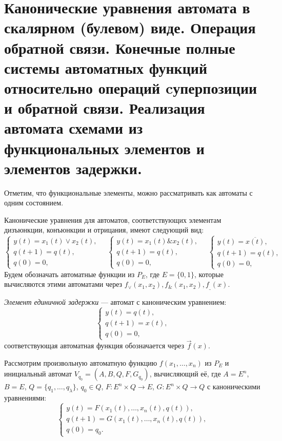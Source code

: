 \section{Канонические уравнения автомата в скалярном (булевом) виде. Операция обратной связи. Конечные полные системы автоматных функций относительно операций cуперпозиции и обратной связи. Реализация автомата схемами из функциональных элементов и элементов задержки.}

Отметим, что функциональные элементы, можно рассматривать как автоматы с одним состоянием.

\begin{definition}
    Канонические уравнения для автоматов, соответствующих элементам дизъюнкции, конъюнкции и отрицания, имеют следующий вид:
    \[
        \begin{cases}
            y(t) = x_1(t)\vee x_2(t),\\
            q(t+1) = q(t),\\
            q(0)=0,
        \end{cases}
        \quad
        \begin{cases}
            y(t) = x_1(t)\&x_2(t),\\
            q(t+1) = q(t),\\
            q(0)=0,
        \end{cases}
        \quad
        \begin{cases}
            y(t) = \overline{x(t)},\\
            q(t+1) = q(t),\\
            q(0)=0,
        \end{cases}
    \]
    Будем обозначать автоматные функции из $P_E$, где $E=\{0, 1\}$, которые вычисляются этими автоматами через $f_\vee(x_1, x_2), f_\&(x_1,x_2), f_\_(x)$.
\end{definition}

\begin{definition}
    \textit{Элемент единичной задержки} --- автомат с каноническим уравнением:
    \[
    \begin{cases}
            y(t) = q(t),\\
            q(t+1) = x(t),\\
            q(0)=0,
    \end{cases}
    \]
    соответствующая автоматная функция обозначается через $\vec{f}(x)$.
\end{definition}

Рассмотрим произвольную автоматную функцию $f(x_1, \ldots, x_n)$ из $P_E$ и инициальный автомат $V_{q_0} = (A, B, Q, F, G_{q_0})$, вычисляющий её, где $A=E^n$, $B=E$, $Q=\{q_1, \ldots, q_\lambda\}$, $q_0 \in Q$, $F:E^n \times Q \to E$, $G:E^n \times Q \to Q$ с каноническими уравнениями:
\[
    \begin{cases}
        y(t) = F(x_1(t), \ldots, x_n(t), q(t)),\\
        q(t+1) = G(x_1(t), \ldots, x_n(t), q(t)),\\
        q(0) = q_0.
    \end{cases}
\]

